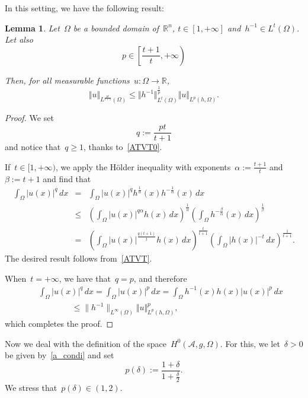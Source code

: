 \documentclass[11pt,hyp,]{nyjm}
\numberwithin{equation}{section}
\newcommand{\R}{\mathbb{R}}
\newtheorem{lemma}[theorem]{Lemma}
\theoremstyle{remark}
\newcommand{\into}{\int_{\Omega}}
\renewcommand{\leq}{\leqslant}
\renewcommand{\le}{\leqslant}
\renewcommand{\ge}{\geqslant}
\begin{document}
In this setting, we have the following result: 
			
\begin{lemma}\label{gt}
Let~$\Omega$ be a bounded domain of~$\R^n$, $t\in [ 1,+\infty]$ and~$h^{-1} \in L^t(\Omega)$. Let also
\begin{equation}\label{ATVT0}
p \in \left[\frac{t+1}t, +\infty\right)\end{equation}
				
				Then, for all measurable functions~$u:\Omega\to\R$,
				\[ \Vert u \Vert_{L^{\frac{pt}{t+1}}(\Omega)} \leq  \Vert h^{-1} \Vert^{\frac{1}{p}}_{L^t(\Omega)}  \Vert u \Vert_{L^p(h,\Omega)}.\]
			\end{lemma}
			
			\begin{proof}
			We set	\begin{equation}\label{ATVT}q :=
				\frac{pt}{t+1}
\end{equation} and notice that~$q\ge1$, thanks to~\eqref{ATVT0}.
			
 If~$t\in[1,+\infty)$, we apply the H\"older inequality with exponents~$\alpha:=\frac{t+1}t$ and~$\beta:=t+1$
			and find that
				\begin{eqnarray*}
\into |u(x)|^q \, dx &=& \into |u(x)|^q h^{\frac{1}{\alpha}}(x) h^{-\frac{1}{\alpha}}(x) \, dx \\&\leq& \left(\into |u(x)|^{q \alpha} h(x) \, dx \right)^{\frac{1}{\alpha}} \left( \into h^{-\frac{\beta}{\alpha}}(x) \, dx \right)^{\frac{1}{\beta}}  \\&
					=& \left( \into |u(x)|^{\frac{q(t+1)}{t}} h(x) \, dx \right)^{\frac{t}{t+1}}  \left( \into  \left|h(x) \right|^{-t} \, dx \right)^{\frac{1}{t+1}}.
				\end{eqnarray*}
				The desired result follows from~\eqref{ATVT}.
				
When~$t=+\infty$, we have that~$q=p$, and therefore
\begin{eqnarray*}&&\into |u(x)|^q \, dx =\into |u(x)|^p \, dx = \into h^{-1}(x)h(x)|u(x)|^p \, dx\\&&\qquad\qquad\le
\|h^{-1}\|_{L^\infty(\Omega)}  \Vert u \Vert_{L^p(h,\Omega)}^p,\end{eqnarray*}
which completes the proof.
			\end{proof}

Now we deal with the definition of the space~$H^0(\mathcal{A}, g, \Omega)$.
For this, we let~$\delta>0$ be given by~\eqref{a_condi} and set
				\begin{equation}\label{piz}
					p(\delta):=  \frac{1+\delta}{1+\frac{\delta}{2}}.
				\end{equation}
We stress that~$p(\delta)\in(1,2)$.
\end{document}
